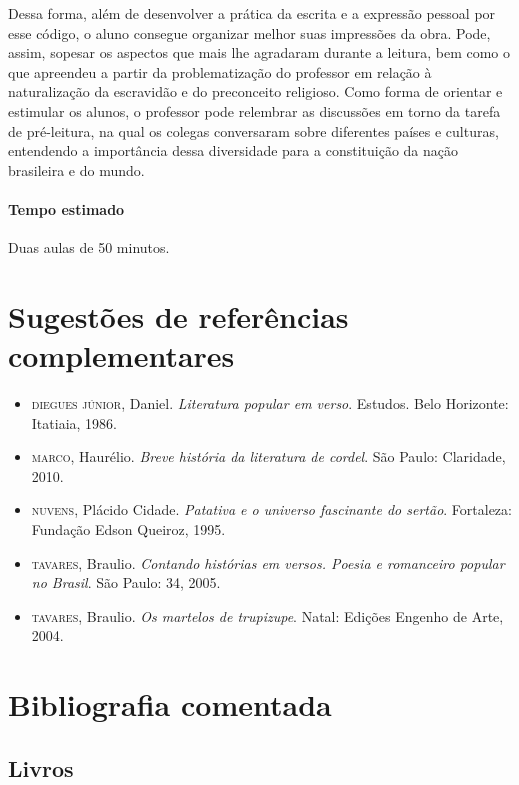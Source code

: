 \documentclass[11pt]{extarticle}
\begin{document}
Dessa forma, além de desenvolver a prática da escrita e a expressão pessoal por esse código, o aluno consegue organizar melhor suas impressões da obra. Pode, assim, sopesar os aspectos que mais lhe agradaram durante a leitura, bem como o que apreendeu a partir da problematização do professor em relação à naturalização da escravidão e do preconceito religioso. Como forma de orientar e estimular os alunos, o professor pode relembrar as discussões em torno da tarefa de pré-leitura, na qual os colegas conversaram sobre diferentes países e culturas, entendendo a importância dessa diversidade para a constituição da nação brasileira e do mundo.

\paragraph{Tempo estimado} Duas aulas de 50 minutos.


\section{Sugestões de referências complementares}


\begin{itemize}
\item \textsc{diegues júnior}, Daniel. \textit{Literatura popular em verso}. Estudos. Belo Horizonte: Itatiaia, 1986. 

\item \textsc{marco}, Haurélio. \textit{Breve história da literatura de cordel}. São Paulo: Claridade, 2010.

\item \textsc{nuvens}, Plácido Cidade. \textit{Patativa e o universo fascinante
do sertão}. Fortaleza: Fundação Edson Queiroz, 1995.

\item \textsc{tavares}, Braulio. \textit{Contando histórias em versos. Poesia e romanceiro popular no Brasil}. São Paulo: 34, 2005.

\item \textsc{tavares}, Braulio. \textit{Os martelos de trupizupe}. Natal: Edições Engenho de Arte, 2004.
\end{itemize}

\section{Bibliografia comentada}

\subsection{Livros}
\end{document}
